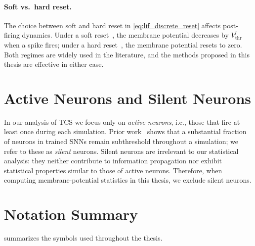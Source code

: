 \paragraph{Soft vs.\ hard reset.}
The choice between soft and hard reset in \cref{eq:lif_discrete_reset} affects post-firing dynamics. Under a soft reset~\cite{rueckauer:2016}, the membrane potential decreases by $V^{l}_{\text{thr}}$ when a spike fires; under a hard reset~\cite{wu:2018}, the membrane potential resets to zero. Both regimes are widely used in the literature, and the methods proposed in this thesis are effective in either case.

\section{Active Neurons and Silent Neurons}
\label{sec:prelim_active}

In our analysis of TCS we focus only on \emph{active neurons}, i.e., those that fire at least once during each simulation. Prior work~\cite{yin:2022} shows that a substantial fraction of neurons in trained SNNs remain subthreshold throughout a simulation; we refer to these as \emph{silent} neurons. Silent neurons are irrelevant to our statistical analysis: they neither contribute to information propagation nor exhibit statistical properties similar to those of active neurons. Therefore, when computing membrane-potential statistics in this thesis, we exclude silent neurons.

\section{Notation Summary}
\label{sec:prelim_notation}

 summarizes the symbols used throughout the thesis.

